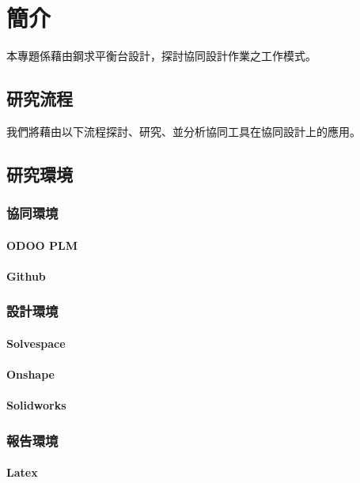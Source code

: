 \chapter{簡介}
\renewcommand{\baselinestretch}{10.0} %

\fontsize{14pt}{2.5pt}\sectionef

本專題係藉由鋼求平衡台設計，探討協同設計作業之工作模式。

\section{研究流程}
我們將藉由以下流程探討、研究、並分析協同工具在協同設計上的應用。\\


\section{研究環境}
\subsection{協同環境}
\subsubsection{ODOO PLM}
\subsubsection{Github}


\subsection{設計環境}
\subsubsection{Solvespace}
\subsubsection{Onshape}
\subsubsection{Solidworks}

\subsection{報告環境}

\subsubsection{Latex}
